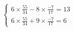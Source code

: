 \documentclass[preview]{standalone}
\begin{document}
\begin{align*}
\left\{ \begin{array}{rcl} 6\times\frac{55}{34} - 8\times\frac{-7}{17}  =  13 \\ 6\times\frac{55}{34} + 9\times\frac{-7}{17} = 6 \end{array} \right.
\end{align*}
\end{document}
